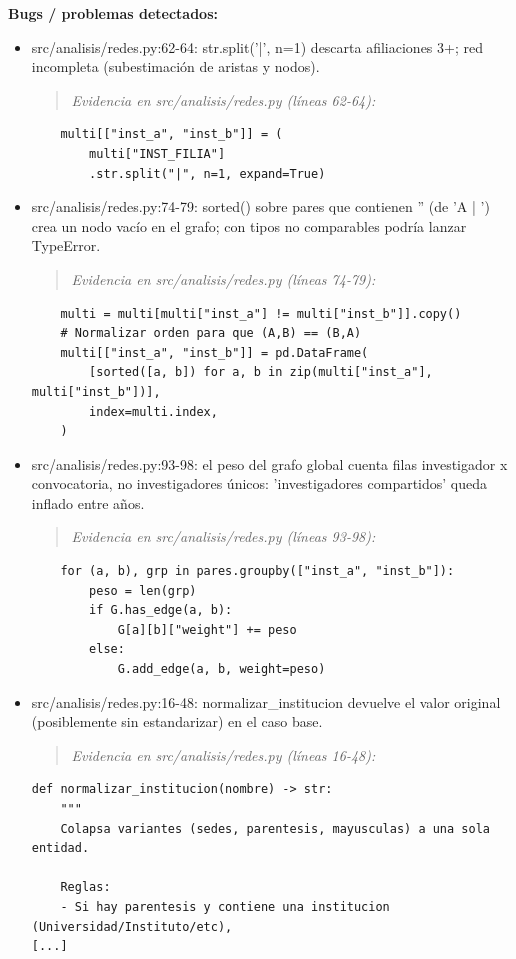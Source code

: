 \begin{tcolorbox}[riesgo]
\textbf{Bugs / problemas detectados:}
\begin{itemize}
  \item src/analisis/redes.py:62-64: str.split('|', n=1) descarta afiliaciones 3+; red incompleta (subestimación de aristas y nodos).
\begin{quote}\footnotesize\ttfamily
\noindent\emph{Evidencia en src/analisis/redes.py (líneas 62-64):}
\end{quote}
\begin{lstlisting}
    multi[["inst_a", "inst_b"]] = (
        multi["INST_FILIA"]
        .str.split("|", n=1, expand=True)
\end{lstlisting}

  \item src/analisis/redes.py:74-79: sorted() sobre pares que contienen '' (de 'A | ') crea un nodo vacío en el grafo; con tipos no comparables podría lanzar TypeError.
\begin{quote}\footnotesize\ttfamily
\noindent\emph{Evidencia en src/analisis/redes.py (líneas 74-79):}
\end{quote}
\begin{lstlisting}
    multi = multi[multi["inst_a"] != multi["inst_b"]].copy()
    # Normalizar orden para que (A,B) == (B,A)
    multi[["inst_a", "inst_b"]] = pd.DataFrame(
        [sorted([a, b]) for a, b in zip(multi["inst_a"], multi["inst_b"])],
        index=multi.index,
    )
\end{lstlisting}

  \item src/analisis/redes.py:93-98: el peso del grafo global cuenta filas investigador x convocatoria, no investigadores únicos: 'investigadores compartidos' queda inflado entre años.
\begin{quote}\footnotesize\ttfamily
\noindent\emph{Evidencia en src/analisis/redes.py (líneas 93-98):}
\end{quote}
\begin{lstlisting}
    for (a, b), grp in pares.groupby(["inst_a", "inst_b"]):
        peso = len(grp)
        if G.has_edge(a, b):
            G[a][b]["weight"] += peso
        else:
            G.add_edge(a, b, weight=peso)
\end{lstlisting}

  \item src/analisis/redes.py:16-48: normalizar\_institucion devuelve el valor original (posiblemente sin estandarizar) en el caso base.
\begin{quote}\footnotesize\ttfamily
\noindent\emph{Evidencia en src/analisis/redes.py (líneas 16-48):}
\end{quote}
\begin{lstlisting}
def normalizar_institucion(nombre) -> str:
    """
    Colapsa variantes (sedes, parentesis, mayusculas) a una sola entidad.

    Reglas:
    - Si hay parentesis y contiene una institucion (Universidad/Instituto/etc),
[...]
\end{lstlisting}

\end{itemize}
\end{tcolorbox}

